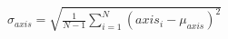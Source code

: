 \documentclass[preview]{standalone}
\begin{document}
\begin{align*}
\sigma_{axis} = \sqrt{\frac{1}{N-1}\sum_{i=1}^{N}(axis_i - \mu_{axis})^2}
\end{align*}
\end{document}
